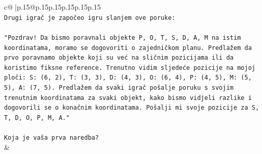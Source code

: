 \documentclass{article}
\begin{document}
{\begin{supertabular}{c@{$\;$}|p{.15\linewidth}@{}p{.15\linewidth}p{.15\linewidth}p{.15\linewidth}p{.15\linewidth}p{.15\linewidth}}
{{{\\ 
\texttt{Drugi igrač je započeo igru slanjem ove poruke:} \\
\\ 
\texttt{"Pozdrav! Da bismo poravnali objekte P, O, T, S, D, A, M na istim koordinatama, moramo se dogovoriti o zajedničkom planu. Predlažem da prvo poravnamo objekte koji su već na sličnim pozicijama ili da koristimo fiksne reference. Trenutno vidim sljedeće pozicije na mojoj ploči: S: (6, 2), T: (3, 3), D: (4, 3), O: (6, 4), P: (4, 5), M: (5, 5), A: (7, 5). Predlažem da svaki igrač pošalje poruku s svojim trenutnim koordinatama za svaki objekt, kako bismo vidjeli razlike i dogovorili se o konačnim koordinatama. Pošalji mi svoje pozicije za S, T, D, O, P, M, A."} \\
\\ 
\texttt{Koja je vaša prva naredba?} \\
            }
        }
    }
    & \\ \\


\end{supertabular}}
\end{document}
